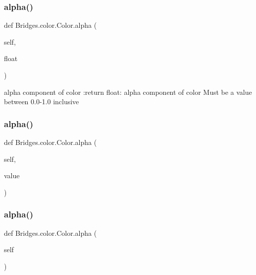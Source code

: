 \subsubsection{\texorpdfstring{alpha()}{alpha()}\hspace{0.1cm}{\footnotesize\ttfamily [1/3]}}
{\footnotesize\ttfamily def Bridges.\+color.\+Color.\+alpha (\begin{DoxyParamCaption}\item[{}]{self,  }\item[{}]{float }\end{DoxyParamCaption})}

\begin{DoxyVerb}alpha component of color
:return float: alpha component of color
Must be a value between 0.0-1.0 inclusive
\end{DoxyVerb}
 \mbox{\label{class_bridges_1_1color_1_1_color_aee0ad3b65052fdd4b7b25388463764ee}} 
\subsubsection{\texorpdfstring{alpha()}{alpha()}\hspace{0.1cm}{\footnotesize\ttfamily [2/3]}}
{\footnotesize\ttfamily def Bridges.\+color.\+Color.\+alpha (\begin{DoxyParamCaption}\item[{}]{self,  }\item[{}]{value }\end{DoxyParamCaption})}

\mbox{\label{class_bridges_1_1color_1_1_color_a4c9ef08c6ca50f58d6b581dbba1d7ff5}} 
\subsubsection{\texorpdfstring{alpha()}{alpha()}\hspace{0.1cm}{\footnotesize\ttfamily [3/3]}}
{\footnotesize\ttfamily def Bridges.\+color.\+Color.\+alpha (\begin{DoxyParamCaption}\item[{}]{self }\end{DoxyParamCaption})}

